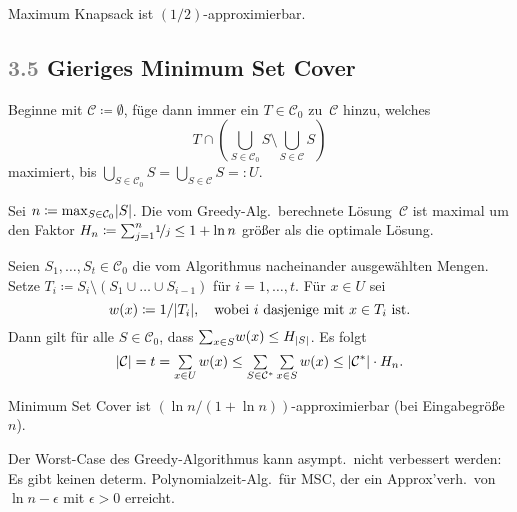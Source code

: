 \documentclass{cheat-sheet}
\newcommand{\size}[1]{\abs{#1}} %
\newcommand{\Problem}[1]{\textcolor{ProblemColor}{\textbf{#1}}}
\newcommand{\scriptSection}[1]{\textcolor{gray}{#1}\enspace}
\begin{document}
\begin{kor}
  Maximum Knapsack ist $(1/2)$-approximierbar.
\end{kor}

\subsection{\scriptSection{3.5} Gieriges \Problem{Minimum Set Cover}}

\begin{alg}
  Beginne mit $\mathcal{C} \coloneqq \emptyset$, füge dann immer ein $T \in \mathcal{C}_0$ zu~$\mathcal{C}$ hinzu, welches
  \[ T \cap \left( {\bigcup}_{S \in \mathcal{C}_0} S \setminus {\bigcup}_{S \in \mathcal{C}} S \right) \]
  maximiert, bis ${\bigcup}_{S \in \mathcal{C}_0} S = {\bigcup}_{S \in \mathcal{C}} S =: U$.
\end{alg}

\begin{satz}
  Sei $n \coloneqq {\max}_{S \in \mathcal{C}_0} \size{S}$.
  Die vom Greedy-Alg.\ berechnete Lösung~$\mathcal{C}$ ist maximal um den Faktor $H_n \coloneqq {\sum}_{j=1}^n \nicefrac{1}{j} \leq 1 + \ln n$ größer als die optimale Lösung.
\end{satz}

\begin{beweisskizze}
  Seien $S_1, \ldots, S_t \in \mathcal{C}_0$ die vom Algorithmus nacheinander ausgewählten Mengen.
  Setze $T_i \coloneqq S_i \setminus (S_1 \cup \ldots \cup S_{i-1})$ für $i = 1, \ldots, t$.
  Für $x \in U$ sei
  \[
    w(x) \coloneqq 1/\size{T_i}, \quad
    \text{wobei $i$ dasjenige mit $x \in T_i$ ist.}
  \]
  Dann gilt für alle $S \in \mathcal{C}_0$, dass ${\sum}_{x \in S} w(x) \leq H_{\size{S}}$.
  Es folgt
  \[
    \size{\mathcal{C}} = t = \sum_{x \in U} w(x) \leq \sum_{S \in \mathcal{C}^*} \sum_{x \in S} w(x) \leq \size{\mathcal{C}^*} \cdot H_n.
  \]
\end{beweisskizze}

\begin{kor}
  Minimum Set Cover ist $(\ln n / (1 + \ln n))$-approximierbar (bei Eingabegröße~$n$).
\end{kor}

\begin{resultat}
  Der Worst-Case des Greedy-Algorithmus kann asympt.\ nicht verbessert werden:
  Es gibt keinen determ. Polynomialzeit-Alg.\ für MSC, der ein Approx'verh.\ von $\ln n - \epsilon$ mit $\epsilon > 0$ erreicht.
\end{resultat}
\end{document}
